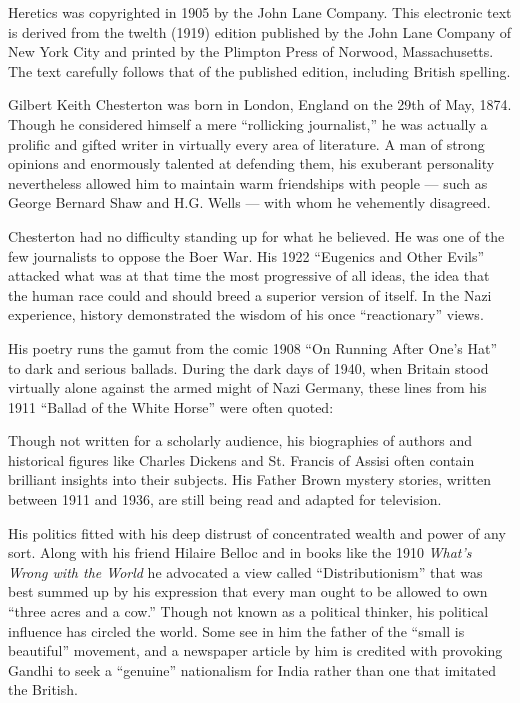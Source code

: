 
Heretics was copyrighted in 1905 by the John Lane Company. This electronic text is derived from the twelth (1919) edition published by the John Lane Company of New York City and printed by the Plimpton Press of Norwood, Massachusetts. The text carefully follows that of the published edition, including British spelling.

Gilbert Keith Chesterton was born in London, England on the 29th of May, 1874. Though he considered himself a mere “rollicking journalist,” he was actually a prolific and gifted writer in virtually every area of literature. A man of strong opinions and enormously talented at defending them, his exuberant personality nevertheless allowed him to maintain warm friendships with people — such as George Bernard Shaw and H.G. Wells — with whom he vehemently disagreed.

Chesterton had no difficulty standing up for what he believed. He was one of the few journalists to oppose the Boer War. His 1922 “Eugenics and Other Evils” attacked what was at that time the most progressive of all ideas, the idea that the human race could and should breed a superior version of itself. In the Nazi experience, history demonstrated the wisdom of his once “reactionary” views.

His poetry runs the gamut from the comic 1908 “On Running After One’s Hat” to dark and serious ballads. During the dark days of 1940, when Britain stood virtually alone against the armed might of Nazi Germany, these lines from his 1911 ``Ballad of the White Horse'' were often quoted:

Though not written for a scholarly audience, his biographies of authors and historical figures like Charles Dickens and St. Francis of Assisi often contain brilliant insights into their subjects. His Father Brown mystery stories, written between 1911 and 1936, are still being read and adapted for television.

His politics fitted with his deep distrust of concentrated wealth and power of any sort. Along with his friend Hilaire Belloc and in books like the 1910 \emph{What’s Wrong with the World} he advocated a view called “Distributionism” that was best summed up by his expression that every man ought to be allowed to own “three acres and a cow.” Though not known as a political thinker, his political influence has circled the world. Some see in him the father of the “small is beautiful” movement, and a newspaper article by him is credited with provoking Gandhi to seek a “genuine” nationalism for India rather than one that imitated the British.

